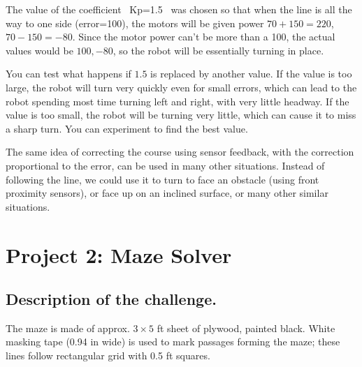 \documentclass[oneside]{stml-l}
\numberwithin{figure}{chapter}
\begin{document}
The value of the coefficient ~Kp=1.5~ was chosen so that when the line is 
all the way to one side (error=100), the motors will be given power 
$70+150=220$, $70-150=-80$. Since the motor power can't be more than a 100, 
the actual values would be $100, -80$, so the robot will be essentially 
turning in place. 

You can test what happens if $1.5$ is replaced by another value. If the 
value is too large, the robot will turn very quickly even for small 
errors, which can lead to the robot spending most time turning left 
and right, with very little headway. If the value is too small, the 
robot will be turning very little, which can cause it to miss a sharp 
turn. You can experiment to find the best value. 

The same idea of correcting the course using sensor feedback, with 
the correction proportional to the error, can be used in many 
other situations. Instead of following the line, we could use it 
to turn to  face an obstacle (using front proximity sensors), or 
face up on an inclined surface, or many other similar situations. 

\chapter{Project 2: Maze Solver}
\section{Description of the challenge.} The maze is made of
approx. $3\times 5$ ft sheet of plywood, painted black. 
White masking tape (0.94 in wide) is used to mark passages 
forming the maze; these lines follow rectangular grid with 
0.5 ft squares. 


\end{document}
